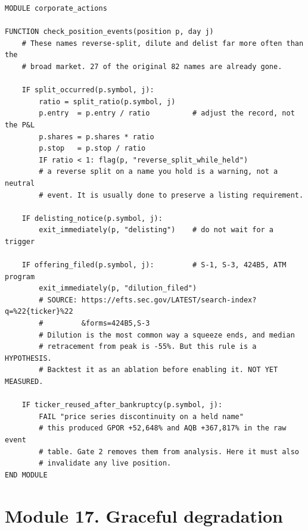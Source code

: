 \documentclass[10pt]{article}
\begin{document}
\begin{lstlisting}
MODULE corporate_actions

FUNCTION check_position_events(position p, day j)
    # These names reverse-split, dilute and delist far more often than the
    # broad market. 27 of the original 82 names are already gone.

    IF split_occurred(p.symbol, j):
        ratio = split_ratio(p.symbol, j)
        p.entry  = p.entry / ratio          # adjust the record, not the P&L
        p.shares = p.shares * ratio
        p.stop   = p.stop / ratio
        IF ratio < 1: flag(p, "reverse_split_while_held")
        # a reverse split on a name you hold is a warning, not a neutral
        # event. It is usually done to preserve a listing requirement.

    IF delisting_notice(p.symbol, j):
        exit_immediately(p, "delisting")    # do not wait for a trigger

    IF offering_filed(p.symbol, j):         # S-1, S-3, 424B5, ATM program
        exit_immediately(p, "dilution_filed")
        # SOURCE: https://efts.sec.gov/LATEST/search-index?q=%22{ticker}%22
        #         &forms=424B5,S-3
        # Dilution is the most common way a squeeze ends, and median
        # retracement from peak is -55%. But this rule is a HYPOTHESIS.
        # Backtest it as an ablation before enabling it. NOT YET MEASURED.

    IF ticker_reused_after_bankruptcy(p.symbol, j):
        FAIL "price series discontinuity on a held name"
        # this produced GPOR +52,648% and AQB +367,817% in the raw event
        # table. Gate 2 removes them from analysis. Here it must also
        # invalidate any live position.
END MODULE
\end{lstlisting}

\section{Module 17. Graceful degradation}
\end{document}
